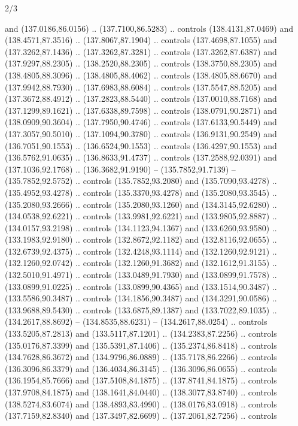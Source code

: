 \begin{flagdescription}{2/3}
\begin{scope}[xshift=0.5\flaglength,yshift=0.5\flagwidth,scale=\flagwidth/180]
\begin{scope}[y=0.8pt, x=0.8pt, yscale=-1,shift={(-168.75,-108.75)}]
  and (137.0186,86.0156) .. (137.7100,86.5283) .. controls (138.4131,87.0469)
  and (138.4571,87.3516) .. (137.8067,87.1904) .. controls (137.4698,87.1055)
  and (137.3262,87.1436) .. (137.3262,87.3281) .. controls (137.3262,87.6387)
  and (137.9297,88.2305) .. (138.2520,88.2305) .. controls (138.3750,88.2305)
  and (138.4805,88.3096) .. (138.4805,88.4062) .. controls (138.4805,88.6670)
  and (137.9942,88.7930) .. (137.6983,88.6084) .. controls (137.5547,88.5205)
  and (137.3672,88.4912) .. (137.2823,88.5440) .. controls (137.0010,88.7168)
  and (137.1299,89.1621) .. (137.6338,89.7598) .. controls (138.0791,90.2871)
  and (138.0909,90.3604) .. (137.7950,90.4746) .. controls (137.6133,90.5449)
  and (137.3057,90.5010) .. (137.1094,90.3780) .. controls (136.9131,90.2549)
  and (136.7051,90.1553) .. (136.6524,90.1553) .. controls (136.4297,90.1553)
  and (136.5762,91.0635) .. (136.8633,91.4737) .. controls (137.2588,92.0391)
  and (137.1036,92.1768) .. (136.3682,91.9190) -- (135.7852,91.7139) --
  (135.7852,92.5752) .. controls (135.7852,93.2080) and (135.7090,93.4278) ..
  (135.4952,93.4278) .. controls (135.3370,93.4278) and (135.2080,93.3545) ..
  (135.2080,93.2666) .. controls (135.2080,93.1260) and (134.3145,92.6280) ..
  (134.0538,92.6221) .. controls (133.9981,92.6221) and (133.9805,92.8887) ..
  (134.0157,93.2198) .. controls (134.1123,94.1367) and (133.6260,93.9580) ..
  (133.1983,92.9180) .. controls (132.8672,92.1182) and (132.8116,92.0655) ..
  (132.6739,92.4375) .. controls (132.4248,93.1114) and (132.1260,92.9121) ..
  (132.1260,92.0742) .. controls (132.1260,91.3682) and (132.1612,91.3155) ..
  (132.5010,91.4971) .. controls (133.0489,91.7930) and (133.0899,91.7578) ..
  (133.0899,91.0225) .. controls (133.0899,90.4365) and (133.1514,90.3487) ..
  (133.5586,90.3487) .. controls (134.1856,90.3487) and (134.3291,90.0586) ..
  (133.9688,89.5430) .. controls (133.6875,89.1387) and (133.7022,89.1035) ..
  (134.2617,88.8692) -- (134.8535,88.6231) -- (134.2617,88.0254) .. controls
  (133.5205,87.2813) and (133.5117,87.1201) .. (134.2383,87.2256) .. controls
  (135.0176,87.3399) and (135.5391,87.1406) .. (135.2374,86.8418) .. controls
  (134.7628,86.3672) and (134.9796,86.0889) .. (135.7178,86.2266) .. controls
  (136.3096,86.3379) and (136.4034,86.3145) .. (136.3096,86.0655) .. controls
  (136.1954,85.7666) and (137.5108,84.1875) .. (137.8741,84.1875) .. controls
  (137.9708,84.1875) and (138.1641,84.0440) .. (138.3077,83.8740) .. controls
  (138.5274,83.6074) and (138.4893,83.4990) .. (138.0176,83.0918) .. controls
  (137.7159,82.8340) and (137.3497,82.6699) .. (137.2061,82.7256) .. controls

\end{scope}
\end{scope}
\end{flagdescription}
